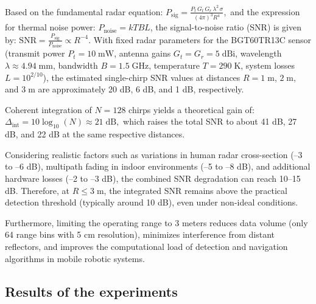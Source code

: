 Based on the fundamental radar equation:
$    P_\text{sig} = \frac{P_t\, G_t\, G_r\, \lambda^2\, \sigma}{(4\pi)^3 R^4},
$
and the expression for thermal noise power:
$ P_\text{noise} = k T B L$, the signal-to-noise ratio (SNR) is given by:
$\text{SNR} = \frac{P_\text{sig}}{P_\text{noise}}     \propto R^{-4}$.
With fixed radar parameters for the BGT60TR13C sensor (transmit power $P_t = 10\;\text{mW}$, antenna gains $G_t = G_r = 5\;\text{dBi}$, wavelength $\lambda \approx 4.94\;\text{mm}$, bandwidth $B = 1.5\;\text{GHz}$, temperature $T = 290\;\text{K}$, system losses $L = 10^{2/10}$), the estimated single-chirp SNR values at distances $R = 1\;\text{m}$, $2\;\text{m}$, and $3\;\text{m}$ are approximately 20 dB, 6 dB, and 1 dB, respectively.

Coherent integration of $N = 128$ chirps yields a theoretical gain of:
$    \Delta_\text{int} = 10 \log_{10}(N) \approx 21\;\text{dB},
$
which raises the total SNR to about 41 dB, 27 dB, and 22 dB at the same respective distances.

Considering realistic factors such as variations in human radar cross-section (–3 to –6 dB), multipath fading in indoor environments (–5 to –8 dB), and additional hardware losses (–2 to –3 dB), the combined SNR degradation can reach 10–15 dB. Therefore, at $R \leq 3\;\text{m}$, the integrated SNR remains above the practical detection threshold (typically around 10 dB), even under non-ideal conditions.

Furthermore, limiting the operating range to 3 meters reduces data volume (only 64 range bins with 5 cm resolution), minimizes interference from distant reflectors, and improves the computational load of detection and navigation algorithms in mobile robotic systems.

\subsection{Results of the experiments}


